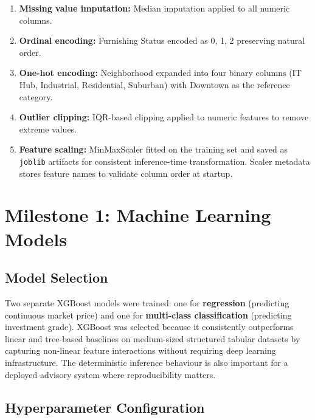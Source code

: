 \documentclass[12pt,a4paper]{article}
\begin{document}
\begin{enumerate}[label=\arabic*., leftmargin=*, itemsep=3pt]
  \item \textbf{Missing value imputation:} Median imputation applied to all numeric columns.
  \item \textbf{Ordinal encoding:} Furnishing Status encoded as 0, 1, 2 preserving natural order.
  \item \textbf{One-hot encoding:} Neighborhood expanded into four binary columns (IT Hub, Industrial, Residential, Suburban) with Downtown as the reference category.
  \item \textbf{Outlier clipping:} IQR-based clipping applied to numeric features to remove extreme values.
  \item \textbf{Feature scaling:} MinMaxScaler fitted on the training set and saved as \texttt{joblib} artifacts for consistent inference-time transformation. Scaler metadata stores feature names to validate column order at startup.
\end{enumerate}

\section{Milestone 1: Machine Learning Models}

\subsection{Model Selection}

Two separate XGBoost models were trained: one for \textbf{regression} (predicting continuous market price) and one for \textbf{multi-class classification} (predicting investment grade). XGBoost was selected because it consistently outperforms linear and tree-based baselines on medium-sized structured tabular datasets by capturing non-linear feature interactions without requiring deep learning infrastructure. The deterministic inference behaviour is also important for a deployed advisory system where reproducibility matters.

\subsection{Hyperparameter Configuration}
\end{document}
